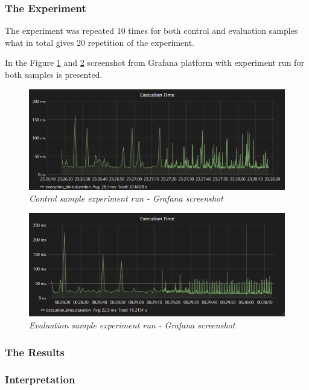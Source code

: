 \documentclass[10pt,a4paper]{article}
\begin{document}
\subsubsection{The Experiment} 

The experiment was repeated 10 times for both control and evaluation samples what in total gives 20 repetition of the experiment. 

In the Figure \ref{batchevaluationscreencontrol} and \ref{batchevaluationscreenevaluation} screenshot from Grafana platform with experiment run for both samples is presented. 

\begin{figure}[!htb]
\centering
\includegraphics[width=1\textwidth]{batchCtrl}
\caption{\textit{Control sample experiment run - Grafana screenshot}} \label{batchevaluationscreencontrol}
\end{figure}
\begin{figure}[!htb]
\centering
\includegraphics[width=1\textwidth]{batchEval}
\caption{\textit{Evaluation sample experiment run - Grafana screenshot}} \label{batchevaluationscreenevaluation}
\end{figure}




\subsubsection{The Results} 
\subsubsection{Interpretation} 
\end{document}
